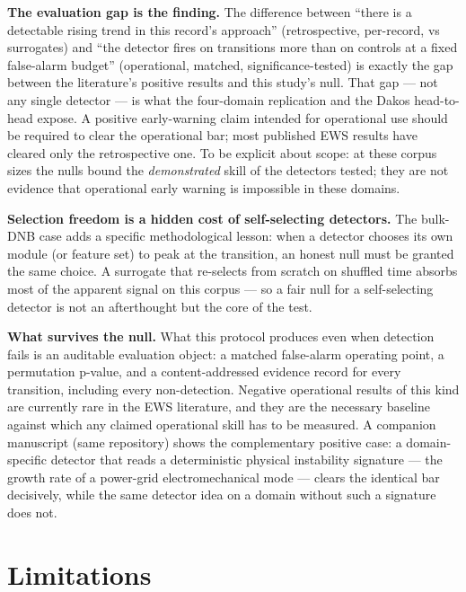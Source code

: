 \documentclass[aip,cha,preprint,amsmath,amssymb]{revtex4-2}
\begin{document}
\textbf{The evaluation gap is the finding.} The difference between
``there is a detectable rising trend in this record's approach''
(retrospective, per-record, vs surrogates) and ``the detector fires on
transitions more than on controls at a fixed false-alarm budget''
(operational, matched, significance-tested) is exactly the gap between
the literature's positive results and this study's null. That gap ---
not any single detector --- is what the four-domain replication and the
Dakos head-to-head expose. A positive early-warning claim intended for
operational use should be required to clear the operational bar; most
published EWS results have cleared only the retrospective one. To be
explicit about scope: at these corpus sizes the nulls bound the
\emph{demonstrated} skill of the detectors tested; they are not
evidence that operational early warning is impossible in these
domains.

\textbf{Selection freedom is a hidden cost of self-selecting
detectors.} The bulk-DNB case adds a specific methodological lesson:
when a detector chooses its own module (or feature set) to peak at the
transition, an honest null must be granted the same choice. A surrogate
that re-selects from scratch on shuffled time absorbs most of the
apparent signal on this corpus --- so a fair null for a self-selecting
detector is not an afterthought but the core of the test.

\textbf{What survives the null.} What this protocol produces even when
detection fails is an auditable evaluation object: a matched
false-alarm operating point, a permutation p-value, and a
content-addressed evidence record for every transition, including every
non-detection. Negative operational results of this kind are currently
rare in the EWS literature, and they are the necessary baseline against
which any claimed operational skill has to be measured. A companion
manuscript (same repository) shows the complementary positive case: a
domain-specific detector that reads a deterministic physical
instability signature --- the growth rate of a power-grid
electromechanical mode --- clears the identical bar decisively, while
the same detector idea on a domain without such a signature does not.

\section{Limitations}\label{sec:limitations}
\end{document}
